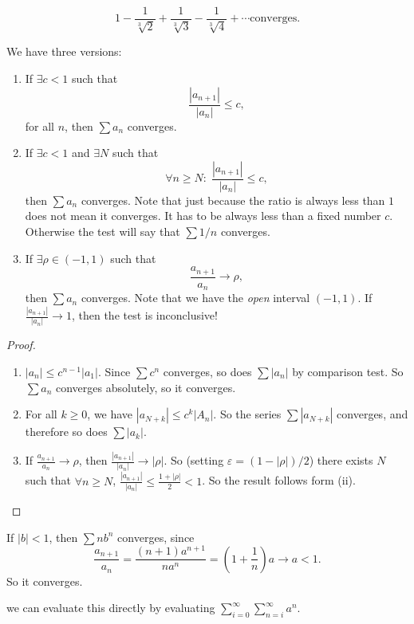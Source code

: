 \documentclass[a4paper]{article}
\begin{document}
\begin{eg}
  \[
    1 - \frac{1}{\sqrt[3]{2}} + \frac{1}{\sqrt[3]{3}} - \frac{1}{\sqrt[3]{4}} + \cdots \text{converges}.
  \]
\end{eg}

\begin{lemma}
  We have three versions:
  \begin{enumerate}
    \item If $\exists c < 1$ such that
      \[
        \frac{|a_{n + 1}|}{|a_n|} \leq c,
      \]
      for all $n$, then $\sum a_n$  converges.
    \item If $\exists c < 1$ and $\exists N$ such that
      \[
        \forall n \geq N:\; \frac{|a_{n + 1}|}{|a_n|} \leq c,
      \]
      then $\sum a_n$  converges. Note that just because the ratio is always less than $1$ does not mean it converges. It has to be always less than a fixed number $c$. Otherwise the test will say that $\sum 1/n$ converges.
    \item If $\exists \rho \in (-1, 1)$ such that
      \[
        \frac{a_{n + 1}}{a_n} \to \rho,
      \]
      then $\sum a_n$ converges. Note that we have the \emph{open} interval $(-1, 1)$. If $\frac{|a_{n + 1}|}{|a_n|} \to 1$, then the test is inconclusive!
  \end{enumerate}
\end{lemma}

\begin{proof}\leavevmode
  \begin{enumerate}
    \item $|a_n| \leq c^{n - 1}|a_1|$. Since $\sum c^n$ converges, so does $\sum |a_n|$ by comparison test. So $\sum a_n$ converges absolutely, so it converges.
    \item For all $k\geq 0$, we have $|a_{N + k}|\leq c^k|A_n|$. So the series $\sum |a_{N + k}|$ converges, and therefore so does $\sum |a_k|$.
    \item If $\frac{a_{n + 1}}{a_n} \to \rho$, then $\frac{|a_{n + 1}|}{|a_n|} \to |\rho|$. So (setting $\varepsilon = (1 - |\rho|)/2$) there exists $N$ such that $\forall n \geq N$, $\frac{|a_{n + 1}|}{|a_n|} \leq \frac{1 + |\rho|}{2} < 1$. So the result follows form (ii).
  \end{enumerate}
\end{proof}

\begin{eg}
  If $|b| < 1$, then $\sum  nb^n$ converges, since
  \[
    \frac{a_{n + 1}}{a_n} = \frac{(n + 1) a^{n + 1}}{na^n} = \left(1 + \frac{1}{n}\right) a\to a < 1.
  \]
  So it converges.

  \note we can evaluate this directly by evaluating $\displaystyle\sum _{i = 0}^\infty \sum_{n = i}^\infty a^n$.
\end{eg}
\end{document}
